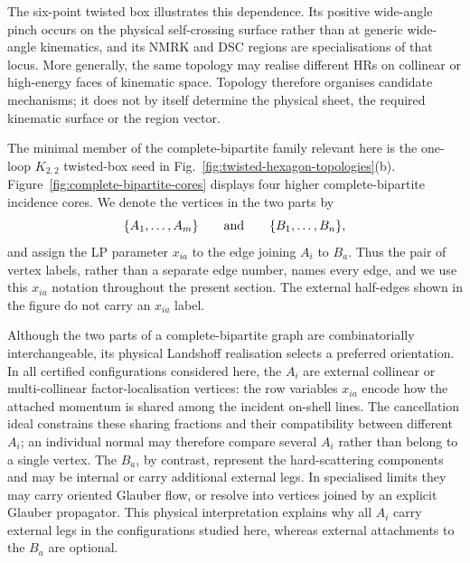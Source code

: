 \documentclass[a4paper,11pt]{article}
\begin{document}
The six-point twisted box illustrates this dependence.  Its positive
wide-angle pinch occurs on the physical self-crossing surface rather than at
generic wide-angle kinematics, and its NMRK and DSC regions are
specialisations of that locus.  More generally, the same topology may realise
different HRs on collinear or high-energy faces of kinematic space.  Topology
therefore organises candidate mechanisms; it does not by itself determine the
physical sheet, the required kinematic surface or the region vector.

The minimal member of the complete-bipartite family relevant here is the
one-loop \(K_{2,2}\) twisted-box seed in
Fig.~\ref{fig:twisted-hexagon-topologies}(b).
Figure~\ref{fig:complete-bipartite-cores} displays four higher
complete-bipartite incidence cores.  We denote
the vertices in the two parts by
\begin{equation}
 \{A_1,\ldots,A_m\}\qquad\hbox{and}\qquad
 \{B_1,\ldots,B_n\},
 \label{eq:Kmn-vertex-partitions}
\end{equation}
and assign the LP parameter \(x_{ia}\) to the edge joining \(A_i\)
to \(B_a\).  Thus the pair of vertex labels, rather than a separate edge
number, names every edge, and we use this \(x_{ia}\) notation throughout the
present section.  The external half-edges shown in the figure do not carry
an \(x_{ia}\) label.

Although the two parts of a complete-bipartite graph are combinatorially
interchangeable, its physical Landshoff realisation selects a preferred
orientation.  In all certified configurations considered here, the \(A_i\)
are external collinear or multi-collinear factor-localisation vertices: the
row variables \(x_{ia}\) encode how the attached momentum is shared among the
incident on-shell lines.  The cancellation ideal constrains these sharing
fractions and their compatibility between different \(A_i\); an individual
normal may therefore compare several \(A_i\) rather than belong to a single
vertex.  The \(B_a\), by contrast, represent the hard-scattering components
and may be internal or carry additional external legs.  In specialised limits
they may carry oriented Glauber flow, or resolve into vertices joined by an
explicit Glauber propagator.  This physical interpretation explains why all
\(A_i\) carry external legs in the configurations studied here, whereas
external attachments to the \(B_a\) are optional.
\end{document}
